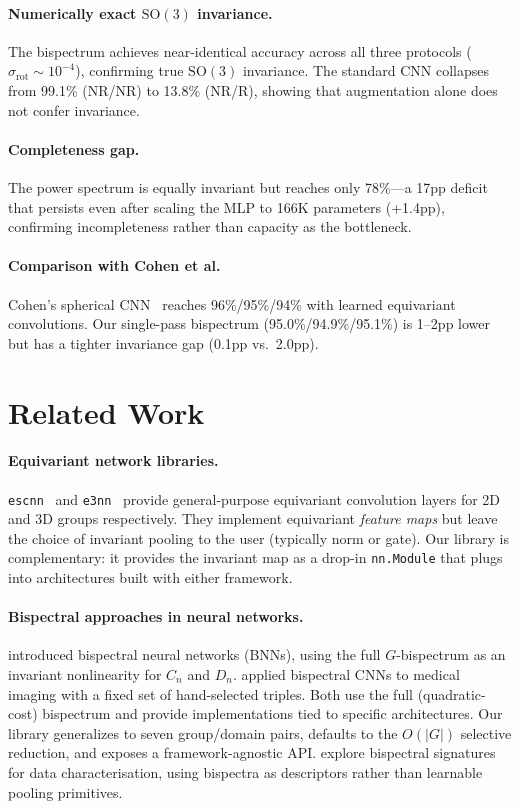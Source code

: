 \documentclass{article}
\theoremstyle{definition}
\theoremstyle{remark}
\newcommand{\SO}{\mathrm{SO}}
\theoremstyle{definition}
\begin{document}
\paragraph{Numerically exact $\SO(3)$ invariance.}
The bispectrum achieves near-identical accuracy across all three protocols
($\sigma_{\mathrm{rot}} \sim 10^{-4}$), confirming true $\SO(3)$
invariance. The standard CNN collapses from 99.1\% (NR/NR) to 13.8\%
(NR/R), showing that augmentation alone does not confer invariance.

\paragraph{Completeness gap.}
The power spectrum is equally invariant but reaches only 78\%---a 17pp
deficit that persists even after scaling the MLP to 166K parameters
(+1.4pp), confirming incompleteness rather than capacity as the
bottleneck.

\paragraph{Comparison with Cohen et al.}
Cohen's spherical CNN~\citep{cohen2018spherical} reaches 96\%/95\%/94\%
with learned equivariant convolutions. Our single-pass bispectrum
(95.0\%/94.9\%/95.1\%) is 1--2pp lower but has a tighter invariance gap
(0.1pp vs.\ 2.0pp).


\section{Related Work}
\label{sec:related}

\paragraph{Equivariant network libraries.}
\texttt{escnn}~\citep{cesa2022program} and \texttt{e3nn}~\citep{geiger2022e3nn}
provide general-purpose equivariant convolution layers for 2D and 3D
groups respectively. They implement equivariant \emph{feature maps} but
leave the choice of invariant pooling to the user (typically norm or
gate). Our library is complementary: it provides the invariant map as a
drop-in \texttt{nn.Module} that plugs into architectures built with either
framework.

\paragraph{Bispectral approaches in neural networks.}
\citet{sanborn2023bispectral} introduced bispectral neural networks (BNNs),
using the full $G$-bispectrum as an invariant nonlinearity for $C_n$ and $D_n$.
\citet{oreiller2022bispectral} applied bispectral CNNs to medical imaging
with a fixed set of hand-selected triples. Both use the full (quadratic-cost)
bispectrum and provide implementations tied to specific architectures.
Our library generalizes to seven group/domain pairs, defaults to the
$O(|G|)$ selective reduction, and exposes a framework-agnostic API.
\citet{chevalley2024bispectral} explore bispectral signatures for data
characterisation, using bispectra as descriptors rather than learnable
pooling primitives.
\end{document}
